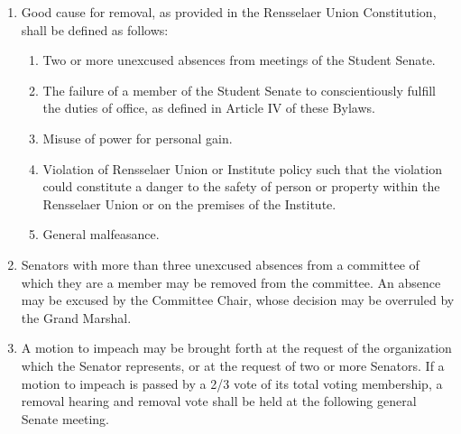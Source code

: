 \documentclass{uniondoc}
\begin{document}
\begin{enumerate}
	\item Good cause for removal, as provided in the Rensselaer Union Constitution, shall be defined as follows:
	      \begin{enumerate}
		      \item Two or more unexcused absences from meetings of the Student Senate.
		      \item The failure of a member of the Student Senate to conscientiously fulfill the duties of office, as defined in Article IV of these Bylaws.
		      \item Misuse of power for personal gain.
		      \item Violation of Rensselaer Union or Institute policy such that the violation could constitute a danger to the safety of person or property within the Rensselaer Union or on the premises of the Institute.
		      \item General malfeasance.
	      \end{enumerate}
	\item Senators with more than three unexcused absences from a committee of which they are a member may be removed from the committee.
	      An absence may be excused by the Committee Chair, whose decision may be overruled by the Grand Marshal.
	\item A motion to impeach may be brought forth at the request of the organization which the Senator represents, or at the request of two or more Senators.
	      If a motion to impeach is passed by a 2/3 vote of its total voting membership, a removal hearing and removal vote shall be held at the following general Senate meeting.
\end{enumerate}

\end{document}
